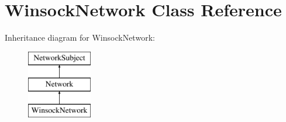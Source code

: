 \hypertarget{classWinsockNetwork}{
\section{WinsockNetwork Class Reference}
\label{classWinsockNetwork}
}
Inheritance diagram for WinsockNetwork:\begin{figure}[H]
\begin{center}
\leavevmode
\includegraphics[height=3cm]{classWinsockNetwork}
\end{center}
\end{figure}

